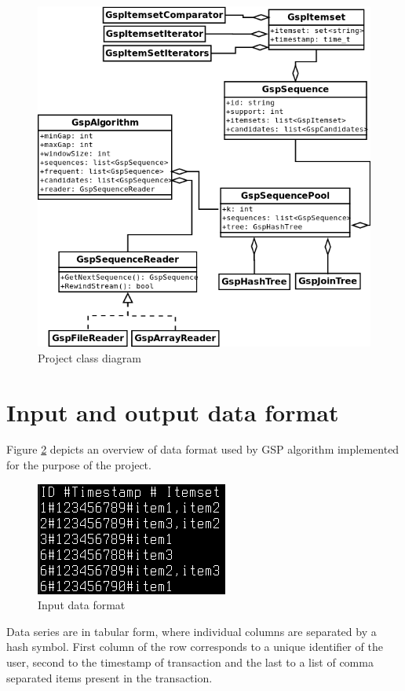 \documentclass[journal,a4paper]{IEEEtran}
\begin{document}
\begin{figure}[!htb]
\centering
\includegraphics[scale=0.3]{figures/uml-class.png}
\caption{Project class diagram}\label{figure:gsp-class-diagram}
\end{figure}


\section{Input and output data format}

Figure \ref{figure:input-format} depicts an overview of data format used by GSP algorithm implemented for the purpose of the project. 
\begin{figure}[!htb]
\centering
\includegraphics[scale=0.6]{figures/input-format.png}
\caption{Input data format}\label{figure:input-format}
\end{figure}

Data series are in tabular form, where individual columns are separated by a hash symbol. First column of the row corresponds to a unique identifier of the user, second to the timestamp of transaction and the last to a list of comma separated items present in the transaction. 
\end{document}
